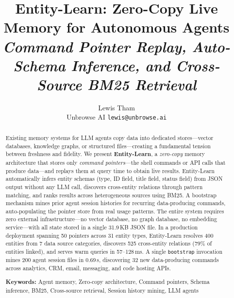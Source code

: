 \documentclass[11pt,twocolumn]{article}
\begin{document}
\title{\textbf{Entity-Learn: Zero-Copy Live Memory for Autonomous Agents}\\[6pt]
\large\textit{Command Pointer Replay, Auto-Schema Inference, and Cross-Source BM25 Retrieval}}

\author{%
  Lewis Tham\\[6pt]
  Unbrowse AI \quad \texttt{lewis@unbrowse.ai}
}

\date{}
\maketitle
\thispagestyle{fancy}

\begin{abstract}
Existing memory systems for LLM agents copy data into dedicated stores---vector databases, knowledge graphs, or structured files---creating a fundamental tension between freshness and fidelity.
We present \textbf{Entity-Learn}, a \emph{zero-copy} memory architecture that stores only \emph{command pointers}---the shell commands or API calls that produce data---and replays them at query time to obtain live results.
Entity-Learn automatically infers entity schemas (type, ID field, title field, status field) from JSON output without any LLM call, discovers cross-entity relations through pattern matching, and ranks results across heterogeneous sources using BM25.
A bootstrap mechanism mines prior agent session histories for recurring data-producing commands, auto-populating the pointer store from real usage patterns.
The entire system requires zero external infrastructure---no vector database, no graph database, no embedding service---with all state stored in a single 31.9\,KB JSON file.
In a production deployment spanning 50 pointers across 31 entity types, Entity-Learn resolves 400 entities from 7 data source categories, discovers 525 cross-entity relations (79\% of entities linked), and serves warm queries in 57--128\,ms.
A single \texttt{bootstrap} invocation mines 200 agent session files in 0.69\,s, discovering 32 new data-producing commands across analytics, CRM, email, messaging, and code hosting APIs.

\medskip
\noindent\textbf{Keywords:} Agent memory, Zero-copy architecture, Command pointers, Schema inference, BM25, Cross-source retrieval, Session history mining, LLM agents
\end{abstract}

\end{document}
